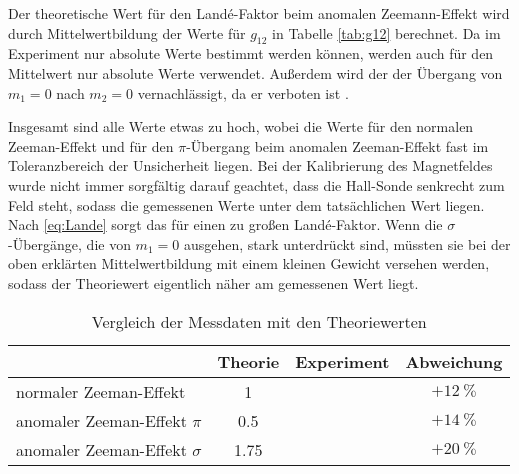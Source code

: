 Der theoretische Wert für den Landé-Faktor beim anomalen Zeemann-Effekt wird durch Mittelwertbildung der Werte für $g_{12}$ in Tabelle \ref{tab:g12} berechnet. Da im Experiment nur absolute Werte bestimmt werden können, werden auch für den Mittelwert nur absolute Werte verwendet. Außerdem wird der der Übergang von $m_1=0$ nach $m_2=0$ vernachlässigt, da er verboten ist \cite{Protokoll}.

Insgesamt sind alle Werte etwas zu hoch, wobei die Werte für den normalen Zeeman-Effekt und für den $\pi$-Übergang beim anomalen Zeeman-Effekt fast im Toleranzbereich der Unsicherheit liegen. Bei der Kalibrierung des Magnetfeldes wurde nicht immer sorgfältig darauf geachtet, dass die Hall-Sonde senkrecht zum Feld steht, sodass die gemessenen Werte unter dem tatsächlichen Wert liegen. Nach \eqref{eq:Lande} sorgt das für einen zu großen Landé-Faktor. Wenn die $\sigma$-Übergänge, die von $m_1=0$ ausgehen, stark unterdrückt sind, müssten sie bei der oben erklärten Mittelwertbildung mit einem kleinen Gewicht versehen werden, sodass der Theoriewert eigentlich näher am gemessenen Wert liegt.
\begin{table}
	\centering
	\begin{tabular}{l|ccc}
		\toprule
		& Theorie & Experiment & Abweichung \\
		\midrule
		normaler Zeeman-Effekt & 1 &  & $+\SI{12}{\%}$ \\
		anomaler Zeeman-Effekt $\pi$ & 0.5 &  & $+\SI{14}{\%}$ \\
		anomaler Zeeman-Effekt $\sigma$ & 1.75 &  & $+\SI{20}{\%}$ \\
		\bottomrule
	\end{tabular}
\caption{Vergleich der Messdaten mit den Theoriewerten}
\label{tab:Vergleich}
\end{table}